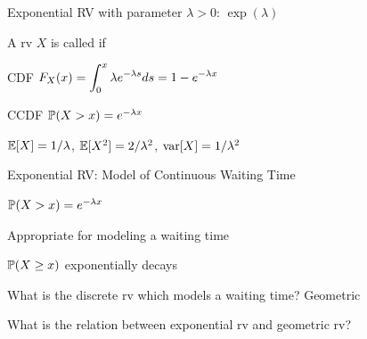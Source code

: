 \begin{frame}{Exponential RV with parameter $\lambda >0$: $\exp(\lambda)$}

\plitemsep 0.1in
\bci 
\item<2-> A rv $X$ is called  if 
\vspace{-0.5cm}
\item<3-> CDF $\displaystyle F_X(x) = \int_{0}^x  \lambda e^{-\lambda s}ds = 1- e^{-\lambda x}$
\item<4-> CCDF $\mathbb{P}( X > x ) = e^{-\lambda x}$ 
\item<5->  $\mathbb{E}[ X ] = 1/\lambda$, $\mathbb{E}[ X^2 ] = 2/\lambda^2$, $\text{var}[ X ] = 1/\lambda^2$

\eci 


\end{frame}

\begin{frame}{Exponential RV: Model of Continuous Waiting Time}

\plitemsep 0.2in
\bci 
\item<1-> $\mathbb{P}( X > x ) = e^{-\lambda x}$ 
\item<2-> Appropriate for modeling a waiting time
\bci
\item $\mathbb{P}( X \ge x )$ exponentially decays
\eci

\item<3->  What is the discrete rv which models a waiting time?  Geometric 

\item<4-> What is the relation between exponential rv and geometric rv? 

\eci 


\end{frame}

